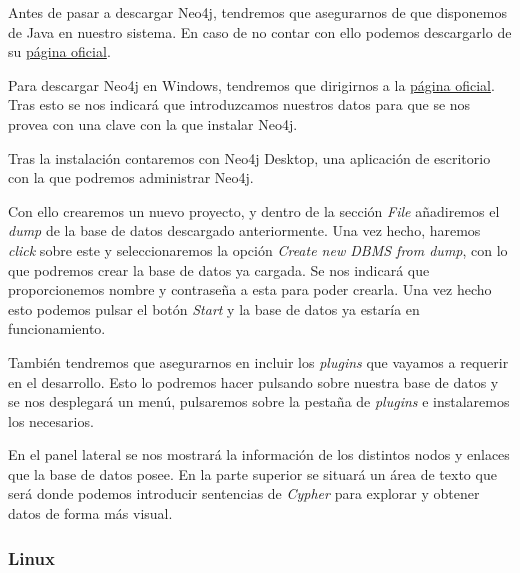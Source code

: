 Antes de pasar a descargar Neo4j, tendremos que asegurarnos de que disponemos de Java en nuestro sistema. En caso de no contar con ello podemos descargarlo de su 
\href{https://www.java.com/es/download/}{página oficial}.

Para descargar Neo4j en Windows, tendremos que dirigirnos a la \href{https://neo4j.com/download/}{página oficial}. Tras esto se nos indicará que introduzcamos nuestros datos para que se nos provea con una clave con la que instalar Neo4j.




Tras la instalación contaremos con Neo4j Desktop, una aplicación de escritorio con la que podremos administrar Neo4j. 




Con ello crearemos un nuevo proyecto, y dentro de la sección \textit{File} añadiremos el \textit{dump} de la base de datos descargado anteriormente. Una vez hecho, haremos \textit{click} sobre este y seleccionaremos la opción \textit{Create new DBMS from dump}, con lo que podremos crear la base de datos ya cargada. Se nos indicará que proporcionemos nombre y contraseña a esta para poder crearla. Una vez hecho esto podemos pulsar el botón \textit{Start} y la base de datos ya estaría en funcionamiento.


También tendremos que asegurarnos en incluir los \textit{plugins} que vayamos a requerir en el desarrollo. Esto lo podremos hacer pulsando sobre nuestra base de datos y se nos desplegará un menú, pulsaremos sobre la pestaña de \textit{plugins} e instalaremos los necesarios.


En el panel lateral se nos mostrará la información de los distintos nodos y enlaces que la base de datos posee. En la parte superior se situará un área de texto que será donde podemos introducir sentencias de \textit{Cypher} para explorar y obtener datos de forma más visual.



\subsubsection{Linux}

